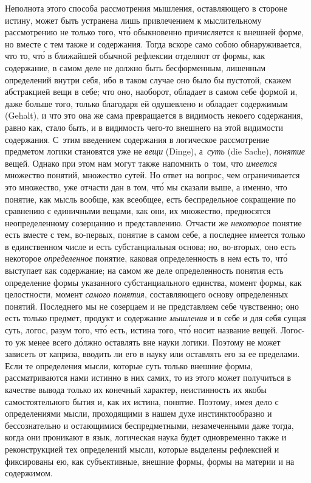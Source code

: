 Неполнота этого способа рассмотрения мышления, оставляющего в стороне истину,
может быть устранена лишь привлечением к мыслительному рассмотрению не только
того, чт\'{о} обыкновенно причисляется к внешней форме, но вместе с тем также и
содержания. Тогда вскоре само собою обнаруживается, что то, чт\'{о} в ближайшей
обычной рефлексии отделяют от формы, как содержание, в самом деле не должно
быть бесформенным, лишенным определений внутри себя, ибо в таком случае оно
было бы пустотой, скажем абстракцией вещи в себе; что оно, наоборот, обладает в
самом себе формой и, даже больше того, только благодаря ей одушевлено и
обладает содержимым (Gehalt), и что это она же сама превращается в видимость
некоего содержания, равно как, стало быть, и в видимость чего-то внешнего на
этой видимости содержания. С~этим введением содержания в логическое
рассмотрение предметом логики становятся уже не {\em вещи} (Dinge),
а~{\em суть} (die Sache), {\em понятие} вещей. Однако при этом нам могут также
напомнить о~том, что {\em имеется} множество понятий, множество сутей. Но ответ
на вопрос, чем ограничивается это множество, уже отчасти дан в том, чт\'{о} мы
сказали выше, а именно, что понятие, как мысль вообще, как всеобщее, есть
беспредельное сокращение по сравнению с единичными вещами, как они, их
множество, предносятся неопределенному созерцанию и представлению. Отчасти же
{\em некоторое} понятие есть вместе с тем, во-первых, понятие в самом себе, а
последнее имеется только в единственном числе и есть субстанциальная основа;
но, во-вторых, оно есть некоторое {\em определенное} понятие, каковая
определенность в нем есть то, чт\'{о} выступает как содержание; на самом же
деле определенность понятия есть определение формы указанного субстанциального
единства, момент формы, как целостности, момент {\em самого понятия},
составляющего основу определенных понятий. Последнего мы не созерцаем и не
представляем себе чувственно; оно есть только предмет, продукт и содержание
{\em мышления} и в себе и для себя сущая суть, логос, разум того, чт\'{о} есть,
истина того, чт\'{о} носит название вещей. Логос-то уж менее всего д\'{о}лжно
оставлять вне науки логики. Поэтому не может зависеть от каприза, вводить ли
его в науку или оставлять его за ее пределами. Если те определения мысли,
которые суть только внешние формы, рассматриваются нами истинно в них самих, то
из этого может получиться в качестве вывода только их конечный характер,
неистинность их якобы самостоятельного бытия и, как их истина, понятие.
Поэтому, имея дело с определениями мысли, проходящими в нашем духе
инстинктообразно и бессознательно и остающимися беспредметными, незамеченными
даже тогда, когда они проникают в язык, логическая наука будет одновременно
также и реконструкцией тех определений мысли, которые выделены рефлексией и
фиксированы ею, как субъективные, внешние формы, формы на материи и на
содержимом.

